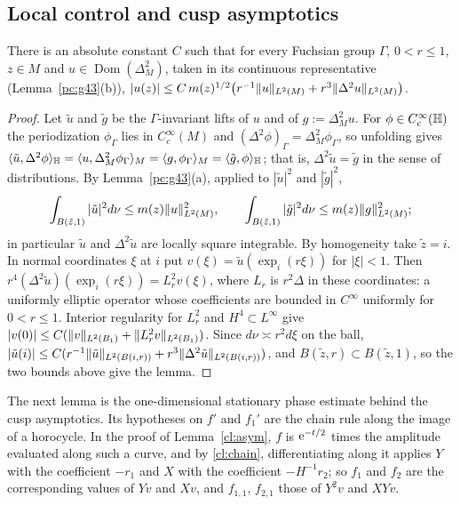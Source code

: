\subsection{Local control and cusp asymptotics}
\begin{lemma}\label{cl:ssob}
There is an absolute constant $C$ such that for every Fuchsian group $\Gamma$, $0<r\le1$, $z\in M$ and
$u\in\operatorname{Dom}(\Delta_M^2)$, taken in its continuous representative (Lemma~\ref{pc:g43}(b)),
$|u(z)|\le C\,m(z)^{1/2}\bigl(r^{-1}\lVert u\rVert_{L^2(M)}+r^3\lVert \Delta^2u\rVert_{L^2(M)}\bigr)$.
\end{lemma}
\begin{proof}
Let $\tilde u$ and $\tilde g$ be the $\Gamma$-invariant lifts of $u$ and of $g:=\Delta_M^2u$. For $\phi\in C_c^\infty(\mathbb{H})$ the
periodization $\phi_\Gamma$ lies in $C_c^\infty(M)$ and $(\Delta^2\phi)_\Gamma=\Delta_M^2\phi_\Gamma$, so unfolding gives
$\langle\tilde u,\Delta^2\phi\rangle_{\mathbb{H}}=\langle u,\Delta_M^2\phi_\Gamma\rangle_M=\langle g,\phi_\Gamma\rangle_M=\langle\tilde g,\phi\rangle_{\mathbb{H}}$; that is,
$\Delta^2\tilde u=\tilde g$ in the sense of distributions. By Lemma~\ref{pc:g43}(a), applied to $|\tilde u|^2$ and $|\tilde g|^2$,
\[
\int_{B(\tilde z,1)}|\tilde u|^2d\nu\le m(z)\lVert u\rVert_{L^2(M)}^2,\qquad\int_{B(\tilde z,1)}|\tilde g|^2d\nu\le m(z)\lVert g\rVert_{L^2(M)}^2 ;
\]
in particular $\tilde u$ and $\Delta^2\tilde u$ are locally square integrable.
By homogeneity take $\tilde z=i$. In normal coordinates $\xi$ at $i$ put $v(\xi)=\tilde u(\exp_i(r\xi))$ for $|\xi|<1$. Then
$r^4(\Delta^2\tilde u)(\exp_i(r\xi))=L_r^2v(\xi)$, where $L_r$ is $r^2\Delta$ in these coordinates: a uniformly elliptic operator whose coefficients are
bounded in $C^\infty$ uniformly for $0<r\le1$. Interior regularity for $L_r^2$ and $H^4\subset L^\infty$ give
$|v(0)|\le C(\lVert v\rVert_{L^2(B_1)}+\lVert L_r^2v\rVert_{L^2(B_1)})$. Since $d\nu\asymp r^2d\xi$ on the ball,
$|\tilde u(i)|\le C(r^{-1}\lVert \tilde u\rVert_{L^2(B(i,r))}+r^3\lVert \Delta^2\tilde u\rVert_{L^2(B(i,r))})$, and $B(\tilde z,r)\subset B(\tilde z,1)$, so the two bounds above
give the lemma.
\end{proof}

The next lemma is the one-dimensional stationary phase estimate behind the cusp asymptotics. Its hypotheses on $f'$ and $f_1'$
are the chain rule along the image of a horocycle. In the proof of Lemma~\ref{cl:asym}, $f$ is $\mathrm{e}^{-t/2}$ times the amplitude
evaluated along such a curve, and by \eqref{cl:chain}, differentiating along it applies $Y$ with the coefficient $-r_1$ and $X$ with
the coefficient $-H^{-1}r_2$; so $f_1$ and $f_2$ are the corresponding values of $Yv$ and $Xv$, and $f_{1,1}$, $f_{2,1}$ those of
$Y^2v$ and $XYv$.


